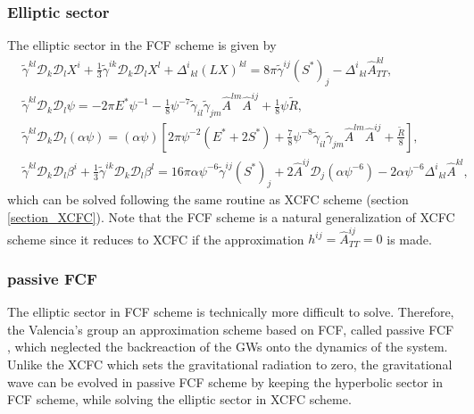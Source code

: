 \subsubsection{Elliptic sector}
The elliptic sector in the FCF scheme is given by
\begin{align}
    &\tilde{\gamma}^{kl} \mathcal{D}_k \mathcal{D}_l X^i + \frac{1}{3}\tilde{\gamma}^{ik}\mathcal{D}_k \mathcal{D}_l X^l
    + \Delta^i{}_{kl} \left( LX \right)^{kl} = 8\pi \tilde{\gamma}^{ij} \left( S^* \right)_j - \Delta^i{}_{kl} \hat{A}^{kl}_{TT}, \label{eq:FCF_X}\\
    & \tilde{\gamma}^{kl} \mathcal{D}_k \mathcal{D}_l \psi = - 2\pi E^* \psi^{-1} 
    - \frac{1}{8} \psi^{-7} \tilde{\gamma}_{il} \tilde{\gamma}_{jm} \hat{A}^{lm} \hat{A}^{ij} + \frac{1}{8}\psi \tilde{R}, \label{eq:FCF_psi}\\
    & \tilde{\gamma}^{kl} \mathcal{D}_k \mathcal{D}_l \left( \alpha \psi \right) = \left(\alpha\psi\right)
    \left[ 2\pi\psi^{-2} \left(E^* + 2 S^* \right) + \frac{7}{8}\psi^{-8}\tilde{\gamma}_{il} \tilde{\gamma}_{jm} \hat{A}^{lm} \hat{A}^{ij}
    + \frac{\tilde{R}}{8}\right], \label{eq:FCF_alp} \\
    &\tilde{\gamma}^{kl} \mathcal{D}_k \mathcal{D}_l \beta^i + \frac{1}{3}\tilde{\gamma}^{ik}\mathcal{D}_k \mathcal{D}_l \beta^l =
    16 \pi \alpha \psi^{-6} \tilde{\gamma}^{ij} \left( S^* \right)_j + 2 \hat{A}^{ij} \mathcal{D}_j \left(\alpha \psi^{-6} \right)
    - 2 \alpha \psi^{-6} \Delta^i{}_{kl} \hat{A}^{kl}, \label{eq:FCF_beta}
\end{align}
which can be solved following the same routine as XCFC scheme (section \ref{section_XCFC}).
Note that the FCF scheme is a natural generalization of XCFC scheme 
since it reduces to XCFC if the approximation $h^{ij} = \hat{A}^{ij}_{TT} = 0$ is made.

\subsubsection{passive FCF}
The elliptic sector in FCF scheme is technically more difficult to solve.
Therefore, the Valencia's group an approximation scheme based on FCF, called passive FCF \cite{cordero2012gravitational},
which neglected the backreaction of the GWs onto the dynamics of the system.
Unlike the XCFC which sets the gravitational radiation to zero,
the gravitational wave can be evolved in passive FCF scheme by keeping the hyperbolic sector in FCF scheme,
while solving the elliptic sector in XCFC scheme.

